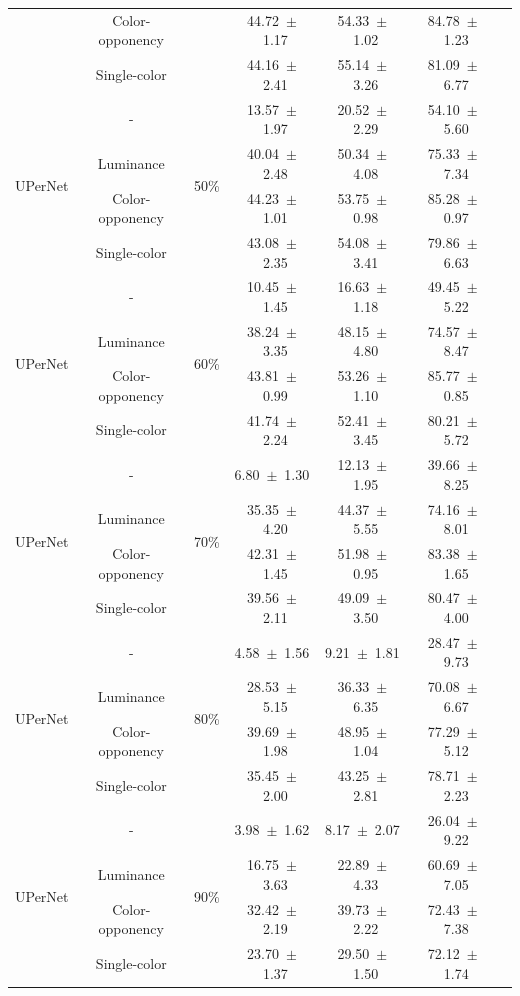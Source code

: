 \begin{table}[h]
\begin{tabular}{@{}lccc ccc@{}}
& Color-opponency & & 44.72~$\pm$~1.17 & 54.33~$\pm$~1.02 & 84.78~$\pm$~1.23 \\
& Single-color & & 44.16~$\pm$~2.41 & 55.14~$\pm$~3.26 & 81.09~$\pm$~6.77 \\
\midrule
\multirow{4}{*}{UPerNet} & - & \multirow{4}{*}{50\%} & 13.57~$\pm$~1.97 & 20.52~$\pm$~2.29 & 54.10~$\pm$~5.60 \\
& Luminance & & 40.04~$\pm$~2.48 & 50.34~$\pm$~4.08 & 75.33~$\pm$~7.34 \\
& Color-opponency & & 44.23~$\pm$~1.01 & 53.75~$\pm$~0.98 & 85.28~$\pm$~0.97 \\
& Single-color & & 43.08~$\pm$~2.35 & 54.08~$\pm$~3.41 & 79.86~$\pm$~6.63 \\
\midrule
\multirow{4}{*}{UPerNet} & - & \multirow{4}{*}{60\%} & 10.45~$\pm$~1.45 & 16.63~$\pm$~1.18 & 49.45~$\pm$~5.22 \\
& Luminance & & 38.24~$\pm$~3.35 & 48.15~$\pm$~4.80 & 74.57~$\pm$~8.47 \\
& Color-opponency & & 43.81~$\pm$~0.99 & 53.26~$\pm$~1.10 & 85.77~$\pm$~0.85 \\
& Single-color & & 41.74~$\pm$~2.24 & 52.41~$\pm$~3.45 & 80.21~$\pm$~5.72 \\
\midrule
\multirow{4}{*}{UPerNet} & - & \multirow{4}{*}{70\%} & 6.80~$\pm$~1.30 & 12.13~$\pm$~1.95 & 39.66~$\pm$~8.25 \\
& Luminance & & 35.35~$\pm$~4.20 & 44.37~$\pm$~5.55 & 74.16~$\pm$~8.01 \\
& Color-opponency & & 42.31~$\pm$~1.45 & 51.98~$\pm$~0.95 & 83.38~$\pm$~1.65 \\
& Single-color & & 39.56~$\pm$~2.11 & 49.09~$\pm$~3.50 & 80.47~$\pm$~4.00 \\
\midrule
\multirow{4}{*}{UPerNet} & - & \multirow{4}{*}{80\%} & 4.58~$\pm$~1.56 & 9.21~$\pm$~1.81 & 28.47~$\pm$~9.73 \\
& Luminance & & 28.53~$\pm$~5.15 & 36.33~$\pm$~6.35 & 70.08~$\pm$~6.67 \\
& Color-opponency & & 39.69~$\pm$~1.98 & 48.95~$\pm$~1.04 & 77.29~$\pm$~5.12 \\
& Single-color & & 35.45~$\pm$~2.00 & 43.25~$\pm$~2.81 & 78.71~$\pm$~2.23 \\
\midrule
\multirow{4}{*}{UPerNet} & - & \multirow{4}{*}{90\%} & 3.98~$\pm$~1.62 & 8.17~$\pm$~2.07 & 26.04~$\pm$~9.22 \\
& Luminance & & 16.75~$\pm$~3.63 & 22.89~$\pm$~4.33 & 60.69~$\pm$~7.05 \\
& Color-opponency & & 32.42~$\pm$~2.19 & 39.73~$\pm$~2.22 & 72.43~$\pm$~7.38 \\
& Single-color & & 23.70~$\pm$~1.37 & 29.50~$\pm$~1.50 & 72.12~$\pm$~1.74 \\
\midrule
\bottomrule
\end{tabular}
\label{tab:sparse_results_upernet_acdc_fog}
\end{table}